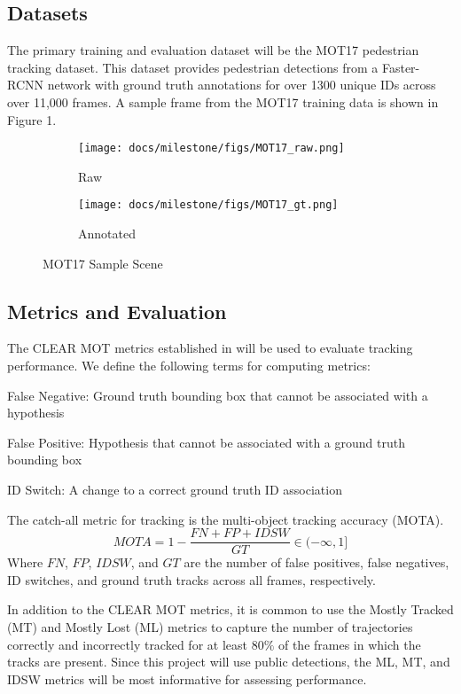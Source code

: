 \documentclass[10pt,twocolumn,letterpaper]{article}
\begin{document}
\subsection{Datasets}
The primary training and evaluation dataset will be the MOT17 \cite{MOT17} pedestrian tracking dataset. This dataset provides pedestrian detections from a Faster-RCNN network with ground truth annotations for over 1300 unique IDs across over 11,000 frames. A sample frame from the MOT17 training data is shown in Figure 1.
\begin{figure}[h!]
    \centering
    \begin{subfigure}[b]{0.48\linewidth}
        \centering
        \texttt{[image: docs/milestone/figs/MOT17\_raw.png]}
        \caption{Raw}
        \label{fig:my_label}
    \end{subfigure}
    \hfill
    \begin{subfigure}[b]{0.48\linewidth}
        \centering
        \texttt{[image: docs/milestone/figs/MOT17\_gt.png]}
        \caption{Annotated}
        \label{fig:my_label}
    \end{subfigure}
    \caption{MOT17 Sample Scene}
\end{figure}
\subsection{Metrics and Evaluation}
The CLEAR MOT metrics established in \cite{Bernardin2008} will be used to evaluate tracking performance. We define the following terms for computing metrics:
\begin{myitemize}
    \item False Negative: Ground truth bounding box that cannot be associated with a hypothesis
    \item False Positive: Hypothesis that cannot be associated with a ground truth bounding box
    \item ID Switch: A change to a correct ground truth ID association
\end{myitemize}
The catch-all metric for tracking is the multi-object tracking accuracy (MOTA).
\begin{equation}
    MOTA = 1-\frac{FN+FP+IDSW}{GT}  \in (-\infty, 1]
\end{equation}
Where $FN$, $FP$, $IDSW$, and $GT$ are the number of false positives, false negatives, ID switches, and ground truth tracks across all frames, respectively. 

In addition to the CLEAR MOT metrics, it is common to use the Mostly Tracked (MT) and Mostly Lost (ML) metrics to capture the number of trajectories correctly and incorrectly tracked for at least $80\%$ of the frames in which the tracks are present. Since this project will use public detections, the ML, MT, and IDSW metrics will be most informative for assessing performance.
\end{document}
